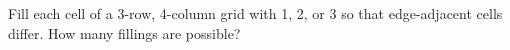 Fill each cell of a 3-row, 4-column grid with 1, 2, or 3 so that edge-adjacent cells differ. How many fillings are possible?

